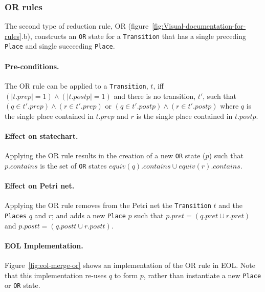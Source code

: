 \documentclass[submission,copyright,creativecommons]{eptcs}
\begin{document}
\subsubsection{OR rules}
The second type of reduction rule, OR (figure~\ref{fig:Visual-documentation-for-rules}.b), constructs an \texttt{OR} state for a \texttt{Transition} that has a single preceding \texttt{Place} and single succeeding \texttt{Place}.

\paragraph{Pre-conditions.} The OR rule can be applied to a \texttt{Transition}, $t$, iff $(\left|t.prep\right| = 1) \land (\left|t.postp\right| = 1)$ and there is no transition, $t'$, such that $(q \in t'.prep) \land (r \in t'.prep)$ or $(q \in t'.postp) \land (r \in t'.postp)$ where $q$ is the single place contained in $t.prep$ and $r$ is the single place contained in $t.postp$.

\paragraph{Effect on statechart.} Applying the OR rule results in the creation of a new \texttt{OR} state ($p$) such that $p.contains$ is the set of \texttt{OR} states $equiv(q).contains \cup equiv(r).contains$.

\paragraph{Effect on Petri net.} Applying the OR rule removes from the Petri net the \texttt{Transition} $t$ and the \texttt{Places} $q$ and $r$; and adds a new \texttt{Place} $p$ such that $p.pret = (q.pret \cup r.pret)$ and $p.postt = (q.postt \cup r.postt)$.

\paragraph{EOL Implementation.} Figure~\ref{fig:eol-merge-or} shows an implementation of the OR rule in EOL. Note that this implementation re-uses $q$ to form $p$, rather than instantiate a new \texttt{Place} or \texttt{OR} state.
\end{document}
